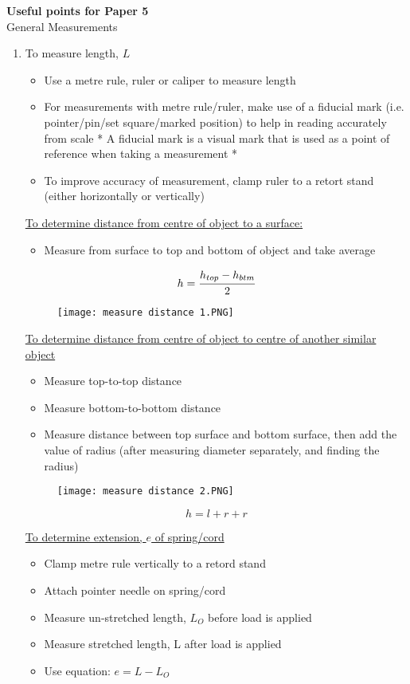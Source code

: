 \documentclass{article}
\begin{document}
\begin{flushleft}
\textbf{Useful points for Paper 5} \\ 
General Measurements
\end{flushleft}
\begin{enumerate}
    \item To measure length, $L$ 
    \begin{itemize}
        \item Use a metre rule, ruler or caliper to measure length
        \item 	For measurements with metre rule/ruler, make use of a fiducial mark (i.e. pointer/pin/set square/marked position) to help in reading accurately from scale
* A fiducial mark is a visual mark that is used as a point of reference when taking a measurement *
        \item 	To improve accuracy of measurement, clamp ruler to a retort stand (either horizontally or vertically)
    \end{itemize}
    
    \underline{To determine distance from centre of object to a surface:}
    \begin{itemize}
        \item Measure from surface to top and bottom of object and take average
    \end{itemize}
$$h=\cfrac{h_{top}-h_{btm}}{2}$$
\begin{figure}[H]
    \centering
    \texttt{[image: measure distance 1.PNG]}
\end{figure}
    
    \underline{To determine distance from centre of object to centre of another similar object}
    \begin{itemize}
        \item Measure top-to-top distance
        \item Measure bottom-to-bottom distance
        \item Measure distance between top surface and bottom surface, then add the value of radius (after measuring diameter separately, and finding the radius)
    \end{itemize}
    \begin{figure}[H]
        \centering
        \texttt{[image: measure distance 2.PNG]}
    \end{figure}
    $$h=l+r+r$$
    
    \underline{To determine extension, $e$ of spring/cord}
    \begin{itemize}
        \item Clamp metre rule vertically to a retord stand 
        \item Attach pointer needle on spring/cord
	\item Measure un-stretched length, $L_O$ before load is applied
    \item	Measure stretched length, L after load is applied
\item Use equation: $e = L-L_O$
    \end{itemize}
    

\end{enumerate}
\end{document}
